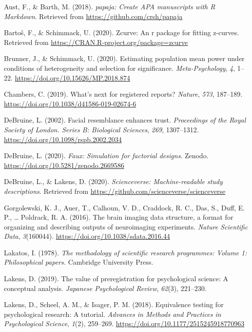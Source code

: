 \documentclass[
  english,
  doc,floatsintext]{apa6}
\begin{document}
\leavevmode\hypertarget{ref-R-papaja}{}%
Aust, F., \& Barth, M. (2018). \emph{papaja: Create APA manuscripts with R Markdown}. Retrieved from \url{https://github.com/crsh/papaja}

\leavevmode\hypertarget{ref-R-zcurve}{}%
Bartoš, F., \& Schimmack, U. (2020). Zcurve: An r package for fitting z-curves. Retrieved from \url{https://CRAN.R-project.org/package=zcurve}

\leavevmode\hypertarget{ref-brunner2020}{}%
Brunner, J., \& Schimmack, U. (2020). Estimating population mean power under conditions of heterogeneity and selection for significance. \emph{Meta-Psychology}, \emph{4}, 1--22. \url{https://doi.org/10.15626/MP.2018.874}

\leavevmode\hypertarget{ref-chambers2019}{}%
Chambers, C. (2019). What's next for registered reports? \emph{Nature}, \emph{573}, 187--189. \url{https://doi.org/10.1038/d41586-019-02674-6}

\leavevmode\hypertarget{ref-debruine2002}{}%
DeBruine, L. (2002). Facial resemblance enhances trust. \emph{Proceedings of the Royal Society of London. Series B: Biological Sciences}, \emph{269}, 1307--1312. \url{https://doi.org/10.1098/rspb.2002.2034}

\leavevmode\hypertarget{ref-R-faux}{}%
DeBruine, L. (2020). \emph{Faux: Simulation for factorial designs}. Zenodo. \url{https://doi.org/10.5281/zenodo.2669586}

\leavevmode\hypertarget{ref-R-scienceverse}{}%
DeBruine, L., \& Lakens, D. (2020). \emph{Scienceverse: Machine-readable study descriptions}. Retrieved from \url{https://github.com/scienceverse/scienceverse}

\leavevmode\hypertarget{ref-bids2016}{}%
Gorgolewski, K. J., Auer, T., Calhoun, V. D., Craddock, R. C., Das, S., Duff, E. P., \ldots{} Poldrack, R. A. (2016). The brain imaging data structure, a format for organizing and describing outputs of neuroimaging experiments. \emph{Nature Scientific Data}, \emph{3}(160044). \url{https://doi.org/10.1038/sdata.2016.44}

\leavevmode\hypertarget{ref-lakatos1978}{}%
Lakatos, I. (1978). \emph{The methodology of scientific research programmes: Volume 1: Philosophical papers.} Cambridge University Press.

\leavevmode\hypertarget{ref-lakens2019}{}%
Lakens, D. (2019). The value of preregistration for psychological science: A conceptual analysis. \emph{Japanese Psychological Review}, \emph{62}(3), 221--230.

\leavevmode\hypertarget{ref-lakens2018}{}%
Lakens, D., Scheel, A. M., \& Isager, P. M. (2018). Equivalence testing for psychological research: A tutorial. \emph{Advances in Methods and Practices in Psychological Science}, \emph{1}(2), 259--269. \url{https://doi.org/10.1177/2515245918770963}
\end{document}
